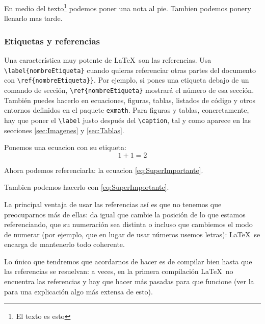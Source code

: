 \begin{LTXexample}[pos=r]
En medio del texto\footnote{
El texto es esto} podemos poner
una nota al pie. Tambien podemos
poner\footnotemark y llenarlo
mas tarde.

\end{LTXexample}


\subsubsection{Etiquetas y referencias}
\label{sec:Etiquetas}

Una característica muy potente de \LaTeX\ son las referencias. Usa \verb|\label{nombreEtiqueta}| cuando quieras referenciar otras partes del documento con \verb|\ref{nombreEtiqueta}}|. Por ejemplo, si pones una etiqueta debajo de un comando de sección, \verb|\ref{nombreEtiqueta}| mostrará el número de esa sección. También puedes hacerlo en ecuaciones, figuras, tablas, listados de código y otros entornos definidos en el paquete \texttt{exmath}. Para figuras y tablas, concretamente, hay que poner el \verb|\label| justo después del \verb|\caption|, tal y como aparece en las secciones \ref{sec:Imagenes} y \ref{sec:Tablas}.

\begin{LTXexample}[pos=r]
Ponemos una ecuacion con su etiqueta:
\begin{equation}
1 + 1 = 2 \label{eq:SuperImportante}
\end{equation}

Ahora podemos referenciarla: la
ecuacion \ref{eq:SuperImportante}.

Tambien podemos hacerlo con \eqref{eq:SuperImportante}.
\end{LTXexample}

La principal ventaja de usar las referencias así es que no tenemos que preocuparnos más de ellas: da igual que cambie la posición de lo que estamos referenciando, que su numeración sea distinta o incluso que cambiemos el modo de numerar (por ejemplo, que en lugar de usar números usemos letras): \LaTeX\ se encarga de mantenerlo todo coherente.

Lo único que tendremos que acordarnos de hacer es de compilar bien hasta que las referencias se resuelvan: a veces, en la primera compilación \LaTeX\ no encuentra las referencias y hay que hacer más pasadas para que funcione (ver la  para una explicación algo más extensa de esto).

